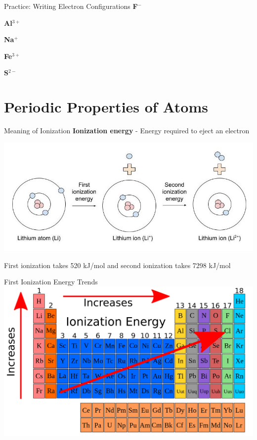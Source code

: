 \documentclass[11pt]{beamer}
\begin{document}
\begin{frame}{Practice: Writing Electron Configurations}
  \textbf{F$^-$}
  \vspace{0.25in}

  \textbf{Al$^{3+}$}
  \vspace{0.25in}

  \textbf{Na$^+$}
  \vspace{0.25in}

  \textbf{Fe$^{3+}$}
  \vspace{0.25in}

  \textbf{S$^{2-}$}
\end{frame}

\section{Periodic Properties of Atoms}

\begin{frame}{Meaning of Ionization}
  \textbf{Ionization energy} - Energy required to eject an electron
  
  \begin{center}
    \includegraphics[width=0.8\linewidth]{ionization_Li}
  \end{center}

  First ionization takes 520 kJ/mol and second ionization takes
  7298 kJ/mol

\end{frame}

\begin{frame}{First Ionization Energy Trends}
  \centering
  \includegraphics[width=\linewidth]{ion_trends}
\end{frame}
\end{document}
